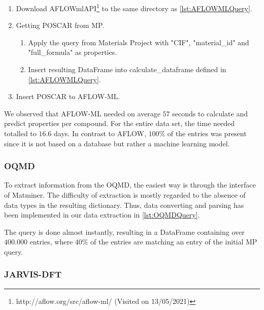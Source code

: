 \begin{enumerate}
  \item Download AFLOWmlAPI\footnote{http://aflow.org/src/aflow-ml/ (Visited on 13/05/2021)} to the same directory as  \autoref{lst:AFLOWMLQuery}.
  \item Getting POSCAR from MP.
  \begin{enumerate}
    \item Apply the query from Materials Project with "CIF", "material\_id" and "full\_formula" as properties.
    \item Insert resulting DataFrame into calculate\_dataframe defined in \autoref{lst:AFLOWMLQuery}.
  \end{enumerate}
    \item Insert POSCAR to AFLOW-ML.
\end{enumerate}


\noindent We observed that AFLOW-ML needed on average $57$ seconds to calculate and predict properties per compound. For the entire data set, the time needed totalled to $16.6$ days. In contrast to AFLOW, $100\%$ of the entries was present since it is not based on a database but rather a machine learning model.

\subsubsection{OQMD}

To extract information from the OQMD, the easiest way is through the interface of Matminer. The difficulty of extraction is mostly regarded to the absence of data types in the resulting dictionary. Thus, data converting and parsing has been implemented in our data extraction in \autoref{lst:OQMDQuery}.

The query is done almost instantly, resulting in a DataFrame containing over $400.000$ entries, where $40$\% of the entries are matching an entry of the initial MP query.



\subsubsection{JARVIS-DFT}

